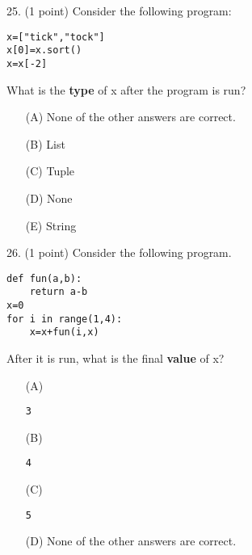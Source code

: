 \documentclass{article}
\begin{document}
\noindent
\begin{minipage}{\textwidth}
25. (1 point)
Consider the following program:
\begin{verbatim}
x=["tick","tock"]
x[0]=x.sort()
x=x[-2]
\end{verbatim}
What is the \textbf{type} of x after the program is run?

\begin{enumerate}
\item[(A)]
None of the other answers are correct.

\item[(B)]
List

\item[(C)]
Tuple

\item[(D)]
None

\item[(E)]
String

\end{enumerate}
\end{minipage}
\vspace{10em}
\filbreak\vfil{}\vfilneg

\noindent
\begin{minipage}{\textwidth}
26. (1 point)
Consider the following program.
\begin{verbatim}
def fun(a,b):
    return a-b
x=0
for i in range(1,4):
    x=x+fun(i,x)
\end{verbatim}
After it is run, what is the final \textbf{value} of x?

\begin{enumerate}
\item[(A)]
\begin{verbatim}3\end{verbatim}

\item[(B)]
\begin{verbatim}4\end{verbatim}

\item[(C)]
\begin{verbatim}5\end{verbatim}

\item[(D)]
None of the other answers are correct.

\end{enumerate}
\end{minipage}
\vspace{10em}
\filbreak\vfil{}\vfilneg
\end{document}
